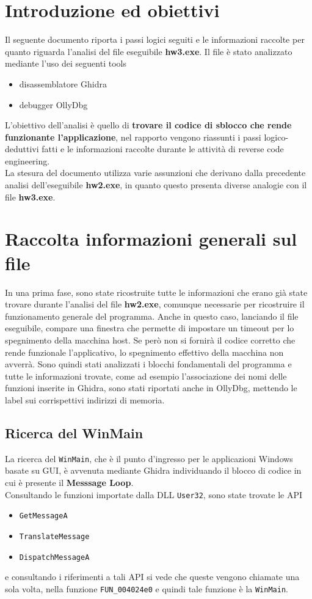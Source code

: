 \documentclass{article}
\begin{document}
\section{Introduzione ed obiettivi}
Il seguente documento riporta i passi logici seguiti e le informazioni raccolte per quanto riguarda l'analisi del file eseguibile \textbf{hw3.exe}. Il file è stato analizzato mediante l'uso dei seguenti tools 
\begin{itemize}
\item disassemblatore Ghidra
\item debugger OllyDbg
\end{itemize}
L'obiettivo dell'analisi è quello di \textbf{trovare il codice di sblocco che rende funzionante l'applicazione}, nel rapporto vengono riassunti i passi logico-deduttivi fatti e le informazioni raccolte durante le attività di reverse code engineering.\\La stesura del documento utilizza varie assunzioni che derivano dalla precedente analisi dell'eseguibile \textbf{hw2.exe}, in quanto questo presenta diverse analogie con il file \textbf{hw3.exe}.
\section{Raccolta informazioni generali sul file}
In una prima fase, sono state ricostruite tutte le informazioni che erano già state trovare durante l'analisi del file \textbf{hw2.exe}, comunque necessarie per ricostruire il funzionamento generale del programma. Anche in questo caso, lanciando il file eseguibile, compare una finestra che permette di impostare un timeout per lo spegnimento della macchina host. Se però non si fornirà il codice corretto che rende funzionale l'applicativo, lo spegnimento effettivo della macchina non avverrà. Sono quindi stati analizzati i blocchi fondamentali del programma e tutte le informazioni trovate, come ad esempio l'associazione dei nomi delle funzioni inserite in Ghidra, sono stati riportati anche in OllyDbg, mettendo le label sui corrispettivi indirizzi di memoria.
\subsection{Ricerca del WinMain}
La ricerca del \texttt{WinMain}, che è il punto d'ingresso per le applicazioni Windows basate su GUI, è avvenuta mediante Ghidra individuando il blocco di codice in cui è presente il \textbf{Messsage Loop}.\\Consultando le funzioni importate dalla DLL \texttt{User32}, sono state trovate le API 
\begin{itemize}
\item \texttt{GetMessageA}
\item \texttt{TranslateMessage}
\item \texttt{DispatchMessageA}
\end{itemize}
e consultando i riferimenti a tali API si vede che queste vengono chiamate una sola volta, nella funzione \texttt{FUN\_004024e0} e quindi tale funzione è la \texttt{WinMain}.
\end{document}
